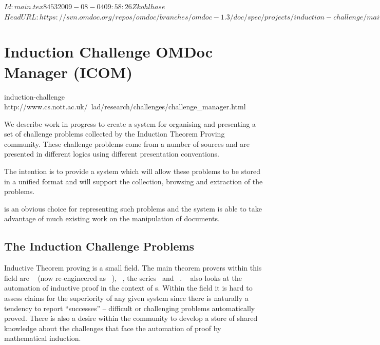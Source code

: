 \svnInfo $Id: main.tex 8453 2009-08-04 09:58:26Z kohlhase $
\svnKeyword $HeadURL: https://svn.omdoc.org/repos/omdoc/branches/omdoc-1.3/doc/spec/projects/induction-challenge/main.tex $

\section[Induction Challenge Problems]{Induction Challenge OMDoc Manager (ICOM)}

\begin{project}{induction-challenge}%
{http://www.cs.nott.ac.uk/~lad/research/challenges/challenge_manager.html}
\end{project}

We describe work in progress to create a system for organising and presenting a set of
challenge problems collected by the Induction Theorem
Proving community.  These challenge problems come from a number of sources and are
presented in different logics using different presentation conventions.

The intention is to provide a system which will allow these problems
to be stored in a unified format and will support the collection,
browsing and extraction of the problems.

{\omdoc} is an obvious choice for representing such problems and the system is able to
take advantage of much existing work on the manipulation of {\xml} documents.

\subsection{The Induction Challenge Problems}
Inductive Theorem proving is a small field.  The main
theorem provers within this field are {\nqthm}~\cite{NQTHM} (now re-engineered as
{\acltwo}~\cite{kaufmann96acl}), {\inka}~\cite{INKA5}, the {\clam}
series~\cite{pub507,lclamsysdesc} and {}~\cite{kapur95overview}.
{\twelf}~\cite{pfenning99system} also looks at the automation of inductive proof in the
context of s.  Within the field it is hard to assess claims
for the superiority of any given system since there is naturally a tendency to report
``successes'' -- difficult or challenging problems automatically proved.  There is also a
desire within the community to develop a store of shared knowledge about the challenges
that face the automation of proof by mathematical induction.

